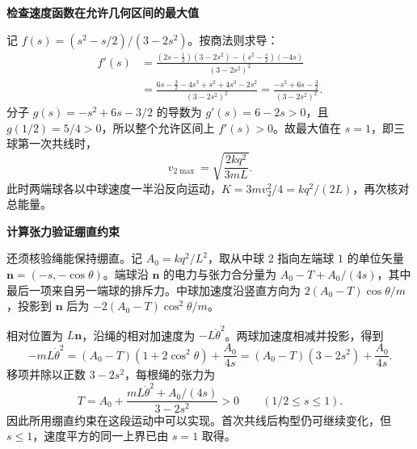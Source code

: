 \begin{solution}
\par\medskip{}\noindent\textbf{检查速度函数在允许几何区间的最大值}\par\nobreak
记 $f(s)=(s^2-s/2)/(3-2s^2)$。按商法则求导：
\begin{align*}
f'(s)&=\frac{(2s-\tfrac12)(3-2s^2)
-(s^2-\tfrac s2)(-4s)}{(3-2s^2)^2}\\
&=\frac{6s-\tfrac32-4s^3+s^2+4s^3-2s^2}{(3-2s^2)^2}
=\frac{-s^2+6s-\tfrac32}{(3-2s^2)^2}.
\end{align*}
分子 $g(s)=-s^2+6s-3/2$ 的导数为 $g'(s)=6-2s>0$，且 $g(1/2)=5/4>0$，所以整个允许区间上 $f'(s)>0$。故最大值在 $s=1$，即三球第一次共线时，
\[
 v_{2\max}=\sqrt{\frac{2kq^2}{3mL}}.
\]
此时两端球各以中球速度一半沿反向运动，$K=3mv_2^2/4=kq^2/(2L)$，再次核对总能量。

\par\medskip{}\noindent\textbf{计算张力验证绷直约束}\par\nobreak
还须核验绳能保持绷直。记 $A_0=kq^2/L^2$，取从中球 $2$ 指向左端球 $1$ 的单位矢量 $\bm n=(-s,-\cos\theta)$。端球沿 $\bm n$ 的电力与张力合分量为 $A_0-T+A_0/(4s)$，其中最后一项来自另一端球的排斥力。中球加速度沿竖直方向为 $2(A_0-T)\cos\theta/m$，投影到 $\bm n$ 后为 $-2(A_0-T)\cos^2\theta/m$。

相对位置为 $L\bm n$，沿绳的相对加速度为 $-L\dot\theta^2$。两球加速度相减并投影，得到
\[
-mL\dot\theta^2
=(A_0-T)(1+2\cos^2\theta)+\frac{A_0}{4s}
=(A_0-T)(3-2s^2)+\frac{A_0}{4s}.
\]
移项并除以正数 $3-2s^2$，每根绳的张力为
\[
 T=A_0+\frac{mL\dot\theta^2+A_0/(4s)}{3-2s^2}>0
 \qquad(1/2\le s\le1).
\]
因此所用绷直约束在这段运动中可以实现。首次共线后构型仍可继续变化，但 $s\le1$，速度平方的同一上界已由 $s=1$ 取得。\end{solution}
